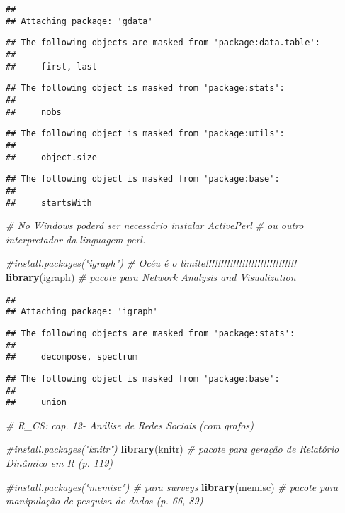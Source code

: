 \documentclass[]{article}
\newenvironment{Shaded}{\begin{snugshade}}{\end{snugshade}}
\newcommand{\KeywordTok}[1]{\textcolor[rgb]{0.13,0.29,0.53}{\textbf{#1}}}
\newcommand{\CommentTok}[1]{\textcolor[rgb]{0.56,0.35,0.01}{\textit{#1}}}
\newcommand{\NormalTok}[1]{#1}
\begin{document}
\begin{verbatim}
## 
## Attaching package: 'gdata'
\end{verbatim}

\begin{verbatim}
## The following objects are masked from 'package:data.table':
## 
##     first, last
\end{verbatim}

\begin{verbatim}
## The following object is masked from 'package:stats':
## 
##     nobs
\end{verbatim}

\begin{verbatim}
## The following object is masked from 'package:utils':
## 
##     object.size
\end{verbatim}

\begin{verbatim}
## The following object is masked from 'package:base':
## 
##     startsWith
\end{verbatim}

\begin{Shaded}
\begin{Highlighting}[]
               \CommentTok{# No Windows poderá ser necessário instalar ActivePerl}
               \CommentTok{# ou outro interpretador da linguagem perl.}

\CommentTok{#install.packages("igraph") # Océu é o limite!!!!!!!!!!!!!!!!!!!!!!!!!!!!!!}
\KeywordTok{library}\NormalTok{(igraph) }\CommentTok{# pacote para Network Analysis and Visualization}
\end{Highlighting}
\end{Shaded}

\begin{verbatim}
## 
## Attaching package: 'igraph'
\end{verbatim}

\begin{verbatim}
## The following objects are masked from 'package:stats':
## 
##     decompose, spectrum
\end{verbatim}

\begin{verbatim}
## The following object is masked from 'package:base':
## 
##     union
\end{verbatim}

\begin{Shaded}
\begin{Highlighting}[]
                \CommentTok{# R_CS: cap. 12- Análise de Redes Sociais (com grafos)}

\CommentTok{#install.packages("knitr")}
\KeywordTok{library}\NormalTok{(knitr) }\CommentTok{# pacote para geração de Relatório Dinâmico em R (p. 119)}

\CommentTok{#install.packages("memisc") # para surveys}
\KeywordTok{library}\NormalTok{(memisc) }\CommentTok{# pacote para manipulação de pesquisa de dados (p. 66, 89)}
\end{Highlighting}
\end{Shaded}
\end{document}
